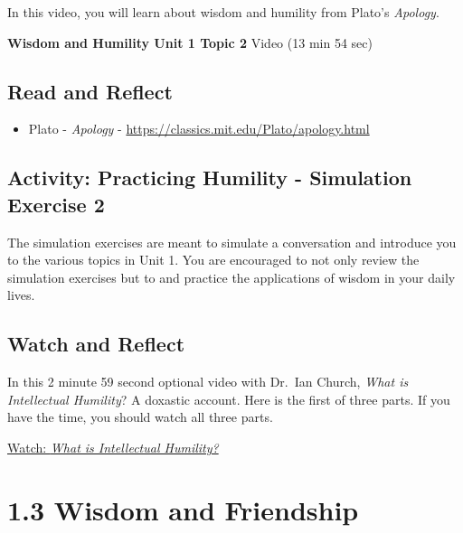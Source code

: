 \documentclass[
]{book}
\providecommand{\tightlist}{%
  \setlength{\itemsep}{0pt}\setlength{\parskip}{0pt}}
\begin{document}
In this video, you will learn about wisdom and humility from Plato's \emph{Apology}.

\textbf{Wisdom and Humility Unit 1 Topic 2} Video (13 min 54 sec)

\hypertarget{read-and-reflect-1}{%
\subsection*{Read and Reflect}\label{read-and-reflect-1}}

\begin{itemize}
\tightlist
\item
  Plato - \emph{Apology} - \url{https://classics.mit.edu/Plato/apology.html}
\end{itemize}

\hypertarget{activity-practicing-humility---simulation-exercise-2}{%
\subsection*{Activity: Practicing Humility - Simulation Exercise 2}\label{activity-practicing-humility---simulation-exercise-2}}

\begin{reflect}
The simulation exercises are meant to simulate a conversation and introduce you to the various topics in Unit 1. You are encouraged to not only review the simulation exercises but to and practice the applications of wisdom in your daily lives.
\end{reflect}

\hypertarget{watch-and-reflect-3}{%
\subsection*{Watch and Reflect}\label{watch-and-reflect-3}}

\begin{reflect}
In this 2 minute 59 second optional video with Dr.~Ian Church, \emph{What is Intellectual Humility}? A doxastic account. Here is the first of three parts. If you have the time, you should watch all three parts.

\href{https://www.youtube.com/watch?v=8CZIkGEJYRY}{Watch: \emph{What is Intellectual Humility?}}
\end{reflect}

\hypertarget{wisdom-and-friendship}{%
\section*{1.3 Wisdom and Friendship}\label{wisdom-and-friendship}}
\end{document}
